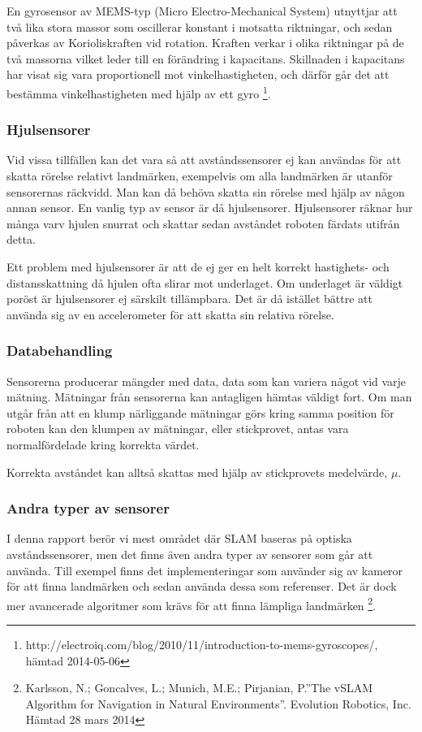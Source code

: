 \documentclass[a4paper,12pt,fleqn]{article}
\begin{document}
En gyrosensor av MEMS-typ (Micro Electro-Mechanical System) utnyttjar att två lika stora massor som oscillerar konstant i motsatta riktningar, och sedan påverkas av Korioliskraften vid rotation. Kraften verkar i olika riktningar på de två massorna vilket leder till en förändring i kapacitans.
Skillnaden i kapacitans har visat sig vara proportionell mot vinkelhastigheten, och därför går det att bestämma vinkelhastigheten med hjälp av ett gyro \footnote{http://electroiq.com/blog/2010/11/introduction-to-mems-gyroscopes/, hämtad 2014-05-06}. 

\subsubsection{Hjulsensorer}

Vid vissa tillfällen kan det vara så att avståndssensorer ej kan användas för att skatta rörelse relativt landmärken, exempelvis om alla landmärken är utanför sensorernas räckvidd. Man kan då behöva skatta sin rörelse med hjälp av någon annan sensor. En vanlig typ av sensor är då hjulsensorer. Hjulsensorer räknar hur många varv hjulen snurrat och skattar sedan avståndet roboten färdats utifrån detta. 

Ett problem med hjulsensorer är att de ej ger en helt korrekt hastighets- och distansskattning då hjulen ofta slirar mot underlaget. Om underlaget är väldigt poröst är hjulsensorer ej särskilt tillämpbara. Det är då istället bättre att använda sig av en accelerometer för att skatta sin relativa rörelse. 

\subsubsection{Databehandling}

Sensorerna producerar mängder med data, data som kan variera något vid varje mätning. Mätningar från sensorerna kan antagligen hämtas väldigt fort. Om man utgår från att en klump närliggande mätningar görs kring samma position för roboten kan den klumpen av mätningar, eller stickprovet, antas vara normalfördelade kring korrekta värdet. 

Korrekta avståndet kan alltså skattas med hjälp av stickprovets medelvärde, $\mu$.

\subsubsection{Andra typer av sensorer}

I denna rapport berör vi mest området där SLAM baseras på optiska avståndssensorer, men det finns även andra typer av sensorer som går att använda. Till exempel finns det implementeringar som använder sig av kameror för att finna landmärken och sedan använda dessa som referenser. Det är dock mer avancerade algoritmer som krävs för att finna lämpliga landmärken \footnote{Karlsson, N.; Goncalves, L.; Munich, M.E.; Pirjanian, P.''The vSLAM Algorithm for Navigation in Natural Environments''. Evolution Robotics, Inc. Hämtad 28 mars 2014}.
\end{document}
